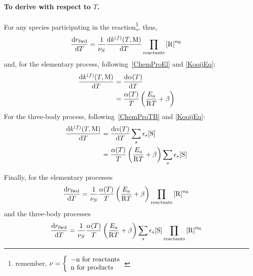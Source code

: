 \paragraph{To derive with respect to $T$.}
For any species  participating in the reaction\footnote{remember, 
$\scoef = \left\{\begin{array}{l}-\scoefabs\text{ for reactants}\\\scoefabs\text{ for products}\end{array}\right.$}.
thus,
\begin{equation}
\doverdT{\ratef} = \frac{1}{\scoef[S]}
                   \doverdT{\rateConsf}
                   \prodReac
\end{equation}
and, for the elementary process, following~\ref{ChemProEl} and \ref{KooijEq}:
\begin{equation}
\begin{split}
\doverdT{\rateConsf} &= \doverdT{\kinMod} \\
                     &= \frac{\kinMod}{T} \left(\frac{E_a}{\Rg T} + \beta\right)
\end{split}
\end{equation}
For the three-body process, following~\ref{ChemProTB} and \ref{KooijEq}:
\begin{equation}
\begin{split}
\doverdT{\rateConsf} &= \doverdT{\kinMod} \threeBody \\
                     &= \frac{\kinMod}{T} \left(\frac{E_a}{\Rg T} + \beta\right) \threeBody
\end{split}
\end{equation}

Finally,
for the elementary processes
\begin{equation}
\doverdT{\ratef} = \frac{1}{\scoef[S]} \frac{\kinMod}{T} \left(\frac{E_a}{\Rg T} + \beta\right)
                                                \prodReac
\label{derivTEP}
\end{equation}
and the three-body processes
\begin{equation}
\doverdT{\ratef} = \frac{1}{\scoef[S]} \frac{\kinMod}{T} \left(\frac{E_a}{\Rg T} + \beta\right) \threeBody
                                                \prodReac
\label{derivTTB}
\end{equation}

